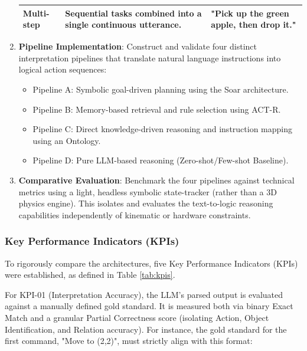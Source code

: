 \documentclass[a4paper]{article}
\begin{document}
\begin{enumerate}
\begin{table}[htbp]
\begin{tabularx}{\textwidth}{@{} l X X @{}}
        \textbf{Multi-step} & Sequential tasks combined into a single continuous utterance. & "Pick up the green apple, then drop it." \\
        \bottomrule
    \end{tabularx}
\end{table}
    
    \item \textbf{Pipeline Implementation}: Construct and validate four distinct interpretation pipelines that translate natural language instructions into logical action sequences:
    \begin{itemize}
        \item Pipeline A: Symbolic goal-driven planning using the Soar architecture.
        \item Pipeline B: Memory-based retrieval and rule selection using ACT-R.
        \item Pipeline C: Direct knowledge-driven reasoning and instruction mapping using an Ontology.
        \item Pipeline D: Pure LLM-based reasoning (Zero-shot/Few-shot Baseline).
    \end{itemize}
    
    \item \textbf{Comparative Evaluation}: Benchmark the four pipelines against technical metrics using a light, headless symbolic state-tracker (rather than a 3D physics engine). This isolates and evaluates the text-to-logic reasoning capabilities independently of kinematic or hardware constraints.
\end{enumerate}

\subsubsection{Key Performance Indicators (KPIs)}
To rigorously compare the architectures, five Key Performance Indicators (KPIs) were established, as defined in Table \ref{tab:kpis}. 

For KPI-01 (Interpretation Accuracy), the LLM's parsed output is evaluated against a manually defined gold standard. It is measured both via binary Exact Match and a granular Partial Correctness score (isolating Action, Object Identification, and Relation accuracy). For instance, the gold standard for the first command, "Move to (2,2)", must strictly align with this format:
\begin{center}
\end{center}
\end{document}

